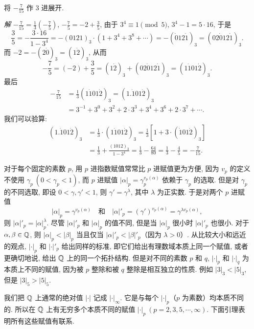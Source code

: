 \begin{example}
将 $-\frac{7}{15}$ 作 $3$ 进展开.

\emph{解} $-\frac{7}{15}=\frac{1}{3}\left(-\frac{7}{5}\right)$, $-\frac{7}{5}=-2+\frac{3}{5}$, 由于 $3^4\equiv 1\pmod{5}$, $3^4-1=5\cdot 16$, 于是
\[
  \frac{3}{5}=-\frac{3\cdot 16}{1-3^4}=-(0121)_3\cdot(1+3^4+3^8+\cdots)
  =-(\dot{0}12\dot{1})_3=(02\dot{0}12\dot{1})_3.
\]
而 $-2=-(2\dot{0})_3=(1\dot{2})_3$, 从而
\[
  -\frac{7}{5}=(-2)+\frac{3}{5}=(1\dot{2})_3+(02\dot{0}12\dot{1})_3=(1\dot{1}01\dot{2})_3.
\]
最后
\begin{align*}
  -\frac{7}{15}&=\frac{1}{3}(1\dot{1}01\dot{2})_3=(1.\dot{1}01\dot{2})_3\\
  &=3^{-1}+3^0+3^2+2\cdot 3^3+3^4+3^6+2\cdot 3^7+\cdots.
\end{align*}
我们可以验算:
\begin{align*}
  (1.\dot{1}01\dot{2})_3&=\frac{1}{3}\cdot(1\dot{1}01\dot{2})_3=\frac{1}{3}\left[1+3\cdot(\dot{1}01\dot{2})_3\right]\\
  &=\frac{1}{3}+\frac{(1012)_3}{1-3^4}=\frac{1}{3}-\frac{64}{80}=\frac{1}{3}-\frac{4}{5}=-\frac{7}{15}.
\end{align*}
\end{example}

对于每个固定的素数 $p$, 用 $p$ 进指数赋值常常比 $p$ 进赋值更为方便, 因为 $v_p$ 的定义不使用 $\gamma_p\ (0<\gamma_p<1)$, 而 $p$ 进赋值 $|\alpha|_p=\gamma_p^{v_p(\alpha)}$ 依赖于 $\gamma_p$ 的选取. 但是对 $\gamma_p$ 的不同选取, 即设 $0<\gamma,\gamma'<1$, 则 $\gamma'=\gamma^{\lambda}$, 其中 $\lambda$ 为正实数. 于是对两个 $p$ 进赋值
\[
  |\alpha|_p=\gamma^{v_p(\alpha)}\quad\text{和}\quad |\alpha|'_p=(\gamma')^{v_p(\alpha)}=\gamma^{\lambda v_p(\alpha)},
\]
则 $|\alpha|'_p=|\alpha|_p^{\lambda}$. 尽管 $|\alpha|'_p$ 和 $|\alpha|_p$ 的值不同, 但是当 $|\alpha|_p$ 很小时 $|\alpha|'_p$ 也很小. 对于 $\alpha,\beta\in\mathbb{Q}$, 则 $|\alpha|_p<|\beta|_p$ 当且仅当 $|\alpha|'_p<|\beta|'_p$（因为 $\lambda>0$）. 从比较大小和远近的观点, $|\cdot|_p$ 和 $|\cdot|'_p$ 给出同样的标准, 即它们给出有理数域本质上同一个赋值, 或者更确切地说, 给出 $\mathbb{Q}$ 上的同一个拓扑结构. 但是对不同的素数 $p$ 和 $q$, $|\cdot|_p$ 和 $|\cdot|_q$ 为本质上不同的赋值, 因为被 $p$ 整除和被 $q$ 整除是相互独立的性质. 例如 $|3|_3<|5|_3$, 但是 $|3|_5>|5|_5$.

我们把 $\mathbb{Q}$ 上通常的绝对值 $|\cdot|$ 记成 $|\cdot|_{\infty}$. 它是与每个 $|\cdot|_p$（$p$ 为素数）均本质不同的. 所以在 $\mathbb{Q}$ 上有无穷多个本质不同的赋值 $|\cdot|_p\ (p=2,3,5,\cdots,\infty)$. 下面引理表明所有这些赋值有联系.

